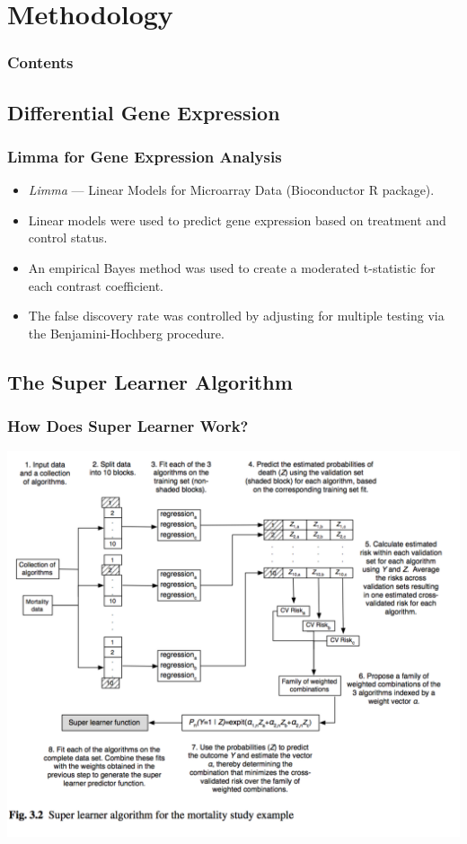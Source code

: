 \documentclass{beamer}
\begin{document}
\section{Methodology}

\begin{frame}
        \frametitle{Contents}
        \tableofcontents[currentsection,currentsubsection,hideothersubsections,sectionstyle=show/shaded]
\end{frame}

\subsection{Differential Gene Expression}

\begin{frame}[fragile]
  	\frametitle{Limma for Gene Expression Analysis}
 		\begin{itemize}
			\item \textit{Limma} --- Linear Models for Microarray Data (Bioconductor R package).
			\item Linear models were used to predict gene expression based on treatment and control status.
			\item An empirical Bayes method was used to create a moderated t-statistic for each contrast coefficient.
			\item The false discovery rate was controlled by adjusting for multiple testing via the Benjamini-Hochberg procedure.
		\end{itemize}
\end{frame}

\subsection{The Super Learner Algorithm}

\begin{frame}
	\frametitle{How Does Super Learner Work?}
		\begin{center}
    			\includegraphics[scale=0.45]{../paper/figs/SuperLearn2.png}
		\end{center}
\end{frame}
\end{document}

